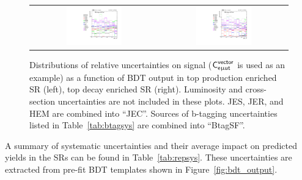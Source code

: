 \begin{figure}[tbh!]
 \begin{center}
 \begin{tabular}{cc}
 \includegraphics[width=0.45\textwidth]{figures/Part3/Systematics/sysBDT_ST_sig_2017}&
 \includegraphics[width=0.45\textwidth]{figures/Part3/Systematics/sysBDT_TT_sig_2017} \\
 \end{tabular}
 \caption{Distributions of relative uncertainties on signal ($\textsf{C}^{\textsf{vector}}_{\textsf{e}\upmu\textsf{{u}t}}$ is used as an example) as a function of \ac{BDT} output in top production enriched \ac{SR} (left), top decay enriched \ac{SR} (right). Luminosity and cross-section uncertainties are not included in these plots. \ac{JES}, \ac{JER}, and HEM are combined into ``JEC''. Sources of b-tagging uncertainties listed in Table~\ref{tab:btagsys} are combined into ``BtagSF''.}
 \label{fig:Comp_sys_signal}
 \end{center}
\end{figure}

A summary of systematic uncertainties and their average impact on predicted yields in the \acp{SR} can be found in Table~\ref{tab:repsys}. These uncertainties are extracted from pre-fit \ac{BDT} templates shown in Figure~\ref{fig:bdt_output}.

